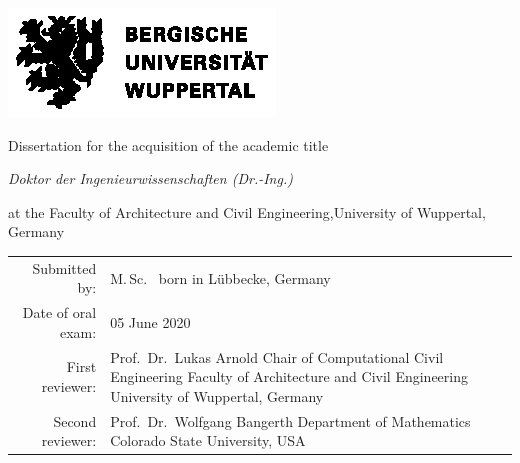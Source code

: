 \begin{titlingpage}
  \begin{center}
    \vspace*{\fill}
    \includegraphics[width=.75\textwidth]{logos/BUW_Logo-schwarz.eps}\bigskip
    \vspace*{\fill}\par
    {\LARGE Dissertation for the acquisition of the academic title\bigskip\par}
    {\LARGE \itshape Doktor der Ingenieurwissenschaften (Dr.-Ing.)\bigskip\par}
    {\LARGE at the Faculty of Architecture and Civil Engineering,\linebreak University of Wuppertal, Germany\bigskip\par}
  \end{center}
  \vspace*{\fill}
  \begin{tabular}{rp{9cm}}
    \Large Submitted by: &
      \Large M.\,Sc.\ \theauthor{} \newline
      \normalsize born in Lübbecke, Germany \bigskip \bigskip \\
    \Large Date of oral exam: &
      \Large 05 June 2020 \bigskip \bigskip \\
    \Large First reviewer: &
      \Large Prof.\ Dr.\ Lukas Arnold \newline
      \normalsize Chair of Computational Civil Engineering \newline
      Faculty of Architecture and Civil Engineering \newline
      University of Wuppertal, Germany \newline \\
    \Large Second reviewer: &
      \Large Prof.\ Dr.\ Wolfgang Bangerth \newline 
      \normalsize Department of Mathematics \newline 
      Colorado State University, USA \\
  \end{tabular}
\end{titlingpage}